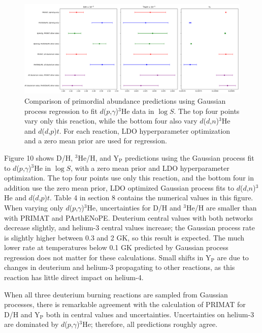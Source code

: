 \documentclass[%
 reprint,
superscriptaddress,
nofootinbib,
 amsmath,amssymb,
 aps,
 pra,
]{revtex4-2}
\begin{document}
\begin{figure}
	\centering
	\includegraphics[width=0.98\linewidth]{Figures/dphe3g_comp.png}
	\caption{Comparison of primordial abundance predictions using Gaussian process regression to fit $d$($p$,$\gamma$)$^3$He data in $\log S$. The top four points vary only this reaction, while the bottom four also vary $d$($d$,$n$)$^3$He and $d$($d$,$p$)$t$. For each reaction, LDO hyperparameter optimization and a zero mean prior are used for regression. }
\end{figure}

Figure 10 shows D/H, $^3$He/H, and Y$_\text{P}$ predictions using the Gaussian process fit to $d$($p$,$\gamma$)$^3$He in $\log S$, with a zero mean prior and LDO hyperparameter optimization. The top four points use only this reaction, and the bottom four in addition use the zero mean prior, LDO optimized Gaussian process fits to $d$($d$,$n$)$^3$He and $d$($d$,$p$)$t$. Table 4 in section 8 contains the numerical values in this figure. When varying only $d$($p$,$\gamma$)$^3$He, uncertainties for D/H and $^3$He/H are smaller than with PRIMAT and PArthENoPE. Deuterium central values with both networks decrease slightly, and helium-3 central values increase; the Gaussian process rate is slightly higher between 0.3 and 2 GK, so this result is expected. The much lower rate at temperatures below 0.1 GK predicted by Gaussian process regression does not matter for these calculations. Small shifts in Y$_\text{P}$ are due to changes in deuterium and helium-3 propagating to other reactions, as this reaction has little direct impact on helium-4. 

When all three deuterium burning reactions are sampled from Gaussian processes, there is remarkable agreement with the calculation of PRIMAT for D/H and Y$_\text{P}$ both in central values and uncertainties. Uncertainties on helium-3 are dominated by $d$($p$,$\gamma$)$^3$He; therefore, all predictions roughly agree. 
\end{document}
